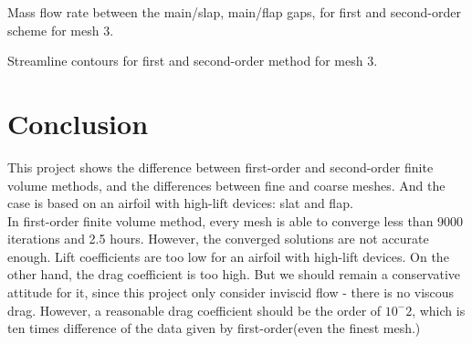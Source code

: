\documentclass[letterpaper,onecolumn,12pt]{article}
\makeatletter
\newenvironment{tablehere}
  {\def\@captype{table}}{}
\newenvironment{figurehere}
  {\def\@captype{figure}}{}
\makeatother
\begin{document}
\bigskip

\begin{tablehere}
\centering
{}
\qquad
{}
\caption{Mass flow rate between the main/slap, main/flap gaps, for first and second-order scheme for mesh 3.}
\end{tablehere}

\begin{figurehere}
 \centering 
  \hspace{.05cm} 
  \caption{Streamline contours for first and second-order method for mesh 3.} 
\end{figurehere}


\section{Conclusion}
This project shows the difference between first-order and second-order finite volume methods, and the differences between fine and coarse meshes. And the case is based on an airfoil with high-lift devices: slat and flap.\\

In first-order finite volume method, every mesh is able to converge less than 9000 iterations and 2.5 hours. However, the converged solutions are not accurate enough. Lift coefficients are too low for an airfoil with high-lift devices.\cite{2} On the other hand, the drag coefficient is too high. But we should remain a conservative attitude for it, since this project only consider inviscid flow - there is no viscous drag. However, a reasonable drag coefficient should be the order of $10^-2$, which is ten times difference of the data given by first-order(even the finest mesh.)\\
\end{document}
